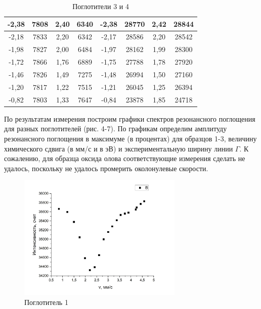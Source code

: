 \documentclass[a4paper,12pt]{article}
\theoremstyle{definition}
\begin{document}
\begin{table}[h]
\begin{tabular}{|c|c|c|c|c|c|c|c|}
-2,38         & 7808          & 2,40          & 6340          & -2,38         & 28770         & 2,42         & 28844        \\ \hline
-2,18         & 7833          & 2,20          & 6342          & -2,17         & 28586         & 2,20         & 28542        \\ \hline
-1,98         & 7827          & 2,00          & 6484          & -1,97         & 28162         & 1,99         & 28300        \\ \hline
-1,72         & 7866          & 1,76          & 6889          & -1,75         & 27788         & 1,78         & 27920        \\ \hline
-1,46         & 7826          & 1,49          & 7275          & -1,48         & 26994         & 1,50         & 27160        \\ \hline
-1,20         & 7817          & 1,22          & 7515          & -1,21         & 26045         & 1,25         & 26394        \\ \hline
-0,82         & 7803          & 1,33          & 7647          & -0,84         & 23878         & 1,85         & 24718        \\ \hline
\end{tabular}
\centering
\caption{Поглотители 3 и 4}
\end{table}

По результатам измерения построим графики спектров резонансного поглощения для разных поглотителей (рис. 4-7). По графикам определим амплитуду резонансного поглощения в максимуме (в процентах) для образцов 1-3, величину химического сдвига (в мм/с и в эВ) и экспериментальную ширину линии $\Gamma$. К сожалению, для образца оксида олова соответствующие измерения сделать не удалось, поскольку не удалось промерить околонулевые скорости.

\begin{figure}[h!]
\begin{center}
\includegraphics[width=0.7\textwidth]{4} 
\caption{Поглотитель 1}
\end{center}
\end{figure}
\end{document}
